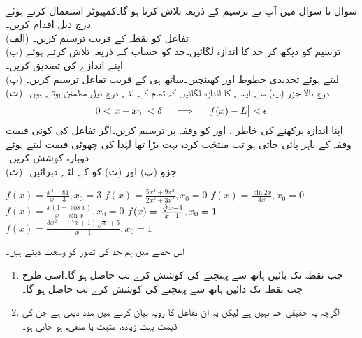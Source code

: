 \\
سوال  تا سوال  میں آپ نے ترسیم کے ذریعہ  تلاش کرنا ہو گا۔کمپیوٹر استعمال کرتے ہوئے درج ذیل اقدام کریں۔\\
(الف) \quad
تفاعل  کو نقطہ  کے قریب ترسیم کریں۔\\
(ب) \quad
ترسیم کو دیکھ کر حد کا اندازہ لگائیں۔حد کو حساب کے ذریعہ تلاش کرتے ہوئے اپنے اندازے کی تصدیق کریں۔\\
(پ)\quad
{} لیتے ہوئے تحدیدی خطوط  اور  کھینچیں۔ساتھ ہی  کے قریب تفاعل  ترسیم  کریں۔\\
(ت) \quad
درج بالا جزو (پ) سے ایسے  کا اندازہ لگائیں کہ تمام  کے لئے درج ذیل مطمئن ہوتے ہوں۔
\begin{align*}
0<\abs{x-x_0}<\delta\quad \implies \quad \abs{f(x)-L}<\epsilon
\end{align*}
اپنا اندازہ پرکھنے کی خاطر ،  اور  کو وقفہ  پر ترسیم کریں۔اگر تفاعل کی کوئی قیمت وقفہ  کے باہر پائی جاتی ہو تب منتخب کردہ بہت بڑا تھا لہٰذا  کی چھوٹی قیمت لیتے ہوئے دوبارہ کوشش کریں۔ \\
(ٹ)\quad
جزو (پ) اور (ت) کو  کے لئے دہرائیں۔

$f(x)=\tfrac{x^4-81}{x-3}, x_0=3$
$f(x)=\tfrac{5x^3+9x^2}{2x^5+3x^2}, x_0=0$
$f(x)=\tfrac{\sin 2x}{3x}, x_0=0$
$f(x)=\tfrac{x(1-\cos x)}{x-\sin x}, x_0=0$
$f(x)=\tfrac{\sqrt[\leftroot{-2}3]{x}-1}{x-1}, x_0=1$
$f(x)=\tfrac{3x^2-(7x+1)\sqrt{x}+5}{x-1}, x_0=1$

اس حصے میں ہم حد کی تصور کو وسعت دیتے ہیں۔
\begin{enumerate}[1.]
\item
{} جب  نقطہ  تک بائیں ہاتھ سے پہنچنے کی کوشش کرے تب  حاصل ہو گا۔اسی طرح جب  نقطہ  تک دائیں ہاتھ سے پہنچنے کی کوشش کرے تب  حاصل ہو گا۔
\item
{} اگرچہ یہ حقیقی حد نہیں ہے لیکن یہ ان تفاعل کا رویہ بیان کرنے میں مدد دیتی ہے جن کی قیمت بہت زیادہ، مثبت یا منفی، ہو جاتی ہو۔  
\end{enumerate}

